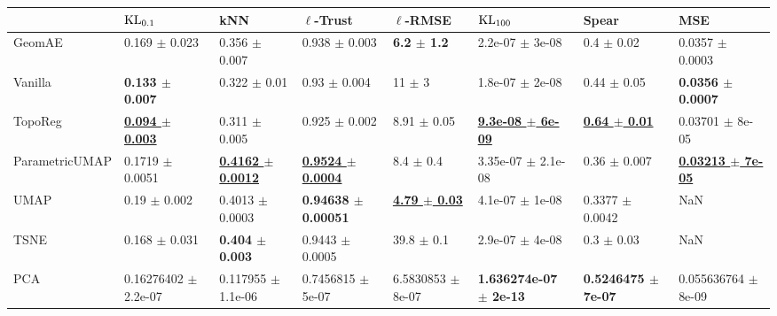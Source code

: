 \begin{tabular}{llllllll}
\toprule
{} &                             $\operatorname{KL}_{0.1}$ &                                        kNN &                               $\ell$-Trust &                            $\ell$-RMSE &                               $\operatorname{KL}_{100}$ &                                  Spear &                                        MSE \\
\midrule
GeomAE         &                        0.169 $\pm$ 0.023 &                          0.356 $\pm$ 0.007 &                          0.938 $\pm$ 0.003 &                 \textbf{6.2 $\pm$ 1.2} &                        2.2e-07 $\pm$ 3e-08 &                         0.4 $\pm$ 0.02 &                        0.0357 $\pm$ 0.0003 \\
Vanilla        &               \textbf{0.133 $\pm$ 0.007} &                           0.322 $\pm$ 0.01 &                           0.93 $\pm$ 0.004 &                             11 $\pm$ 3 &                        1.8e-07 $\pm$ 2e-08 &                        0.44 $\pm$ 0.05 &               \textbf{0.0356 $\pm$ 0.0007} \\
TopoReg        &   \underline{\textbf{0.094 $\pm$ 0.003}} &                          0.311 $\pm$ 0.005 &                          0.925 $\pm$ 0.002 &                        8.91 $\pm$ 0.05 &   \underline{\textbf{9.3e-08 $\pm$ 6e-09}} &   \underline{\textbf{0.64 $\pm$ 0.01}} &                        0.03701 $\pm$ 8e-05 \\
ParametricUMAP &                      0.1719 $\pm$ 0.0051 &   \underline{\textbf{0.4162 $\pm$ 0.0012}} &   \underline{\textbf{0.9524 $\pm$ 0.0004}} &                          8.4 $\pm$ 0.4 &                     3.35e-07 $\pm$ 2.1e-08 &                       0.36 $\pm$ 0.007 &   \underline{\textbf{0.03213 $\pm$ 7e-05}} \\
UMAP           &                         0.19 $\pm$ 0.002 &                        0.4013 $\pm$ 0.0003 &             \textbf{0.94638 $\pm$ 0.00051} &   \underline{\textbf{4.79 $\pm$ 0.03}} &                        4.1e-07 $\pm$ 1e-08 &                    0.3377 $\pm$ 0.0042 &                                        NaN \\
TSNE           &                        0.168 $\pm$ 0.031 &                 \textbf{0.404 $\pm$ 0.003} &                        0.9443 $\pm$ 0.0005 &                         39.8 $\pm$ 0.1 &                        2.9e-07 $\pm$ 4e-08 &                         0.3 $\pm$ 0.03 &                                        NaN \\
PCA            &                 0.16276402 $\pm$ 2.2e-07 &                     0.117955 $\pm$ 1.1e-06 &                      0.7456815 $\pm$ 5e-07 &                  6.5830853 $\pm$ 8e-07 &          \textbf{1.636274e-07 $\pm$ 2e-13} &         \textbf{0.5246475 $\pm$ 7e-07} &                    0.055636764 $\pm$ 8e-09 \\
\bottomrule
\end{tabular}
